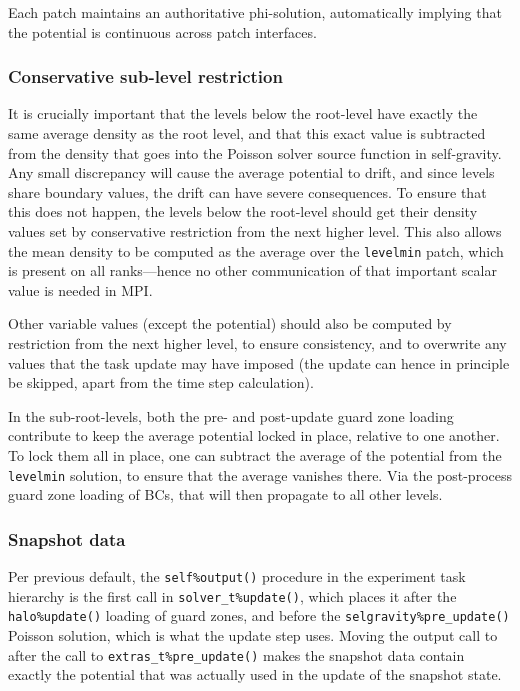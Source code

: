 \documentclass[paper=a4,fontsize=11pt]{scrartcl}
\numberwithin{equation}{section}		%
\numberwithin{figure}{section}			%
\numberwithin{table}{section}				%
\begin{document}
Each patch maintains an authoritative phi-solution, automatically implying that the potential is continuous across patch interfaces. 

\subsubsection{Conservative sub-level restriction}
It is crucially important that the levels below the root-level have exactly the same average density as the root level,    and that this exact value is subtracted from the density that goes into the Poisson solver source function in self-gravity.  Any small discrepancy will cause the average potential to drift, and since levels share boundary values, the drift can have severe consequences.  To ensure that this does not happen, the levels below the root-level should get their density values set by conservative restriction from the next higher level.  This also allows the mean density to be computed as the average over the \verb|levelmin| patch, which is present on all ranks---hence no other communication of that important scalar value is needed in MPI.

Other variable values (except the potential) should also be computed by restriction from the next higher level, to ensure consistency, and to overwrite any values that the task update may have imposed (the update can hence in principle be skipped, apart from the time step calculation).

In the sub-root-levels, both the pre- and post-update guard zone loading contribute to keep the average potential locked in place, relative to one another.  To lock them all in place, one can subtract the average of the potential from the \verb|levelmin| solution, to ensure that the average vanishes there.  Via the post-process guard zone loading of BCs, that will then propagate to all other levels.

\subsubsection{Snapshot data}
Per previous    default, the \verb|self%output()| procedure in the experiment task hierarchy is the first call in \verb|solver_t%update()|, which places it after the \verb|halo%update()| loading of guard zones, and before the \verb|selgravity%pre_update()| Poisson solution, which is what the update step uses.  Moving the output call to after the call to \verb|extras_t%pre_update()| makes the snapshot data contain exactly the potential that was actually used in the update of the snapshot state.
\end{document}
